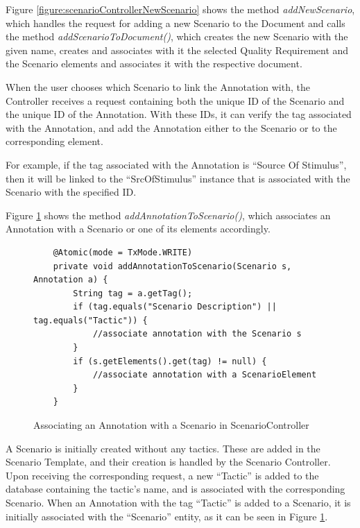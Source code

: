 \documentclass{llncs}
\begin{document}
Figure \ref{figure:scenarioControllerNewScenario} shows the method \textit{addNewScenario}, which handles the request for adding a new Scenario to the Document and calls the method \textit{addScenarioToDocument()}, which creates the new Scenario with the given name, creates and associates with it the selected Quality Requirement and the Scenario elements and associates it with the respective document.

When the user chooses which Scenario to link the Annotation with, the Controller receives a request containing both the unique ID of the Scenario and the unique ID of the Annotation. With these IDs, it can verify the tag associated with the Annotation, and add the Annotation either to the Scenario or to the corresponding element. 

For example, if the tag associated with the Annotation is ``Source Of Stimulus'', then it will be linked to the ``SrcOfStimulus'' instance that is associated with the Scenario with the specified ID.

Figure \ref{figure:scenarioControllerLinkAnnotation} shows the method \textit{addAnnotationToScenario()}, which associates an Annotation with a Scenario or one of its elements accordingly.

\begin{figure}
\lstset{style=customjava}
\begin{lstlisting}
	@Atomic(mode = TxMode.WRITE)
	private void addAnnotationToScenario(Scenario s, Annotation a) {
		String tag = a.getTag();
		if (tag.equals("Scenario Description") || tag.equals("Tactic")) {
			//associate annotation with the Scenario s
		}
		if (s.getElements().get(tag) != null) {
			//associate annotation with a ScenarioElement
		}
	}	
\end{lstlisting}
\caption{Associating an Annotation with a Scenario in ScenarioController}
\label{figure:scenarioControllerLinkAnnotation}
\end{figure}

A Scenario is initially created without any tactics. These are added in the Scenario Template, and their creation is handled by the Scenario Controller. Upon receiving the corresponding request, a new ``Tactic'' is added to the database containing the tactic's name, and is associated with the corresponding Scenario. When an Annotation with the tag ``Tactic'' is added to a Scenario, it is initially associated with the ``Scenario'' entity, as it can be seen in Figure \ref{figure:scenarioControllerLinkAnnotation}. 
\end{document}
